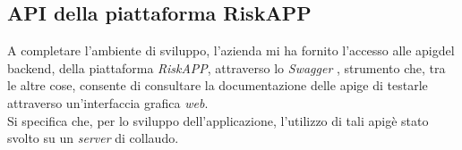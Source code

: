 \subsection*{API della piattaforma RiskAPP}
A completare l'ambiente di sviluppo, l'azienda mi ha fornito l'accesso alle \gls{apig}\glsoccur del \gls{backend}\glsoccur, della piattaforma \emph{RiskAPP}, attraverso lo \emph{Swagger} \cite{site:swagger}, strumento che, tra le altre cose, consente di consultare la documentazione delle \gls{apig}\glsoccur e di testarle attraverso un'interfaccia grafica \emph{web}.\\
Si specifica che, per lo sviluppo dell'applicazione, l'utilizzo di tali \gls{apig}\glsoccur è stato svolto su un \emph{server} di collaudo.
